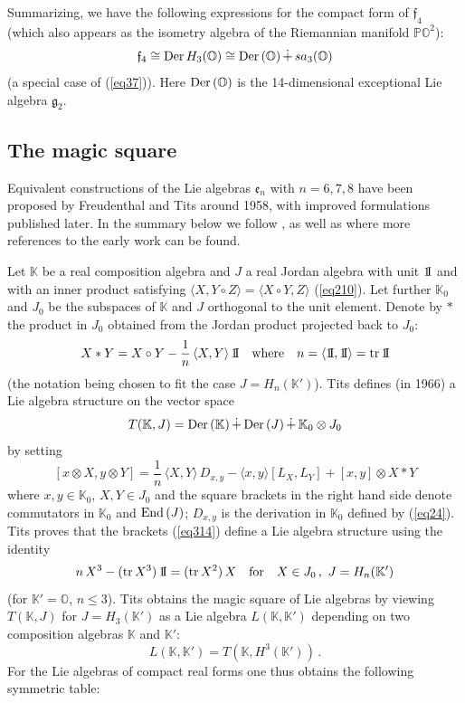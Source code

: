 \documentclass{article}
\newcommand{\be}{\begin{equation}}
\newcommand{\ee}{\end{equation}}
\def\un{{\rm 1\mkern-4mu I}}
\begin{document}
\smallskip

Summarizing, we have the following expressions for the compact form of ${\mathfrak f}_4$ (which also appears as the isometry algebra of the Riemannian manifold ${\mathbb P} {\mathbb O}^2$):
\be
\label{eq311}
{\mathfrak f}_4 \cong {\rm Der} \, H_3 ({\mathbb O}) \cong {\rm Der} \, ({\mathbb O}) \, \dot + \, sa_3 ({\mathbb O}) 
\ee
(a special case of (\ref{eq37})). Here ${\rm Der}\, ({\mathbb O})$ is the 14-dimensional exceptional Lie algebra $\mathfrak g_2$.

\subsection{The magic square}

Equivalent constructions of the Lie algebras ${\mathfrak e}_n$ with $n  = 6,7,8$ have been proposed by Freudenthal and Tits around 1958, with improved formulations published later. In the summary below we follow \cite{BS}, as well as \cite{B} where more references to the early work can be found.

\smallskip

Let ${\mathbb K}$ be a real composition algebra and $J$ a real Jordan algebra with unit $\un$ and with an inner product satisfying $\langle X , Y \circ Z \rangle = \langle X \circ Y , Z \rangle$ (\ref{eq210}). Let further ${\mathbb K}_0$ and $J_0$ be the subspaces of ${\mathbb K}$ and $J$ orthogonal to the unit element. Denote by $*$ the product in $J_0$ obtained from the Jordan product projected back to $J_0$:
\be
\label{eq312}
X * Y = X \circ Y - \frac1n \, \langle X,Y \rangle \, \un \quad \mbox{where} \quad n = \langle \un , \un \rangle = {\rm tr} \, \un
\ee
(the notation being chosen to fit the case $J = H_n ({\mathbb K}')$). Tits defines (in 1966) a Lie algebra structure on the vector space
\be
\label{eq313}
T ({\mathbb K} , J) = {\rm Der} \, ({\mathbb K}) \, \dot + \, {\rm Der} \, (J) \, \dot + \, {\mathbb K}_0 \otimes J_0
\ee
by setting
\be
\label{eq314}
[x \otimes X , y \otimes Y] = \frac1n \, \langle X,Y \rangle \, D_{x,y} - \langle x,y \rangle [L_X , L_Y] + [x,y] \otimes X * Y
\ee
where $x,y \in {\mathbb K}_0$, $X,Y \in J_0$ and the square brackets in the right hand side denote commutators in ${\mathbb K}_0$ and ${\rm End} \, (J)$; $D_{x,y}$ is the derivation in ${\mathbb K}_0$ defined by (\ref{eq24}). Tits proves that the brackets (\ref{eq314}) define a Lie algebra structure using the identity
\be
\label{eq315}
n \, X^3 - ({\rm tr} \, X^3) \, \un = ({\rm tr} \, X^2) \, X \quad \mbox{for} \quad X \in J_0 \, , \ J = H_n ({\mathbb K}')
\ee
(for ${\mathbb K}' = {\mathbb O}$, $n \leq 3$). Tits obtains the magic square of Lie algebras by viewing $T({\mathbb K} , J)$ for $J = H_3 ({\mathbb K}')$ as a Lie algebra $L({\mathbb K} , {\mathbb K}')$ depending on two composition algebras ${\mathbb K}$ and ${\mathbb K}'$:
\be
\label{eq316}
L({\mathbb K} , {\mathbb K}') = T ({\mathbb K} , H^3 ({\mathbb K}')) \, .
\ee
For the Lie algebras of compact real forms one thus obtains the following symmetric table:
\end{document}
